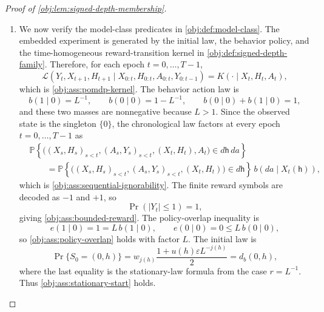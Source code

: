 \documentclass[11pt]{article}
\begin{document}
\begin{proof}[Proof of \cref{obj:lem:signed-depth-membership}]
\begin{enumerate}
\item We now verify the model-class predicates in \cref{obj:def:model-class}.
The embedded experiment is generated by the initial law, the behavior policy,
and the time-homogeneous reward-transition kernel in
\cref{obj:def:signed-depth-family}.  Therefore, for each epoch
\(t=0,\ldots,T-1\),
\[
\mathcal L(Y_t,X_{t+1},H_{t+1}\mid X_{0:t},H_{0:t},A_{0:t},Y_{0:t-1})
=
K(\cdot\mid X_t,H_t,A_t),
\]
which is \cref{obj:ass:pomdp-kernel}.  The behavior action law is
\[
b(1\mid0)=L^{-1},
\qquad
b(0\mid0)=1-L^{-1},
\qquad
b(0\mid0)+b(1\mid0)=1,
\]
and these two masses are nonnegative because \(L>1\).  Since the observed
state is the singleton \(\{0\}\), the chronological law factors at every epoch
\(t=0,\ldots,T-1\) as
\[
\begin{aligned}
&\mathbb P\!\left\{
\bigl((X_s,H_s)_{s<t},(A_s,Y_s)_{s<t},(X_t,H_t),A_t\bigr)
\in d\mathsf h\,da
\right\} \\
&\qquad=
\mathbb P\!\left\{
\bigl((X_s,H_s)_{s<t},(A_s,Y_s)_{s<t},(X_t,H_t)\bigr)
\in d\mathsf h
\right\}\,b(da\mid X_t(\mathsf h)),
\end{aligned}
\]
which is \cref{obj:ass:sequential-ignorability}.  The finite reward symbols are
decoded as \(-1\) and \(+1\), so
\[
\Pr(|Y_t|\le1)=1,
\]
giving \cref{obj:ass:bounded-reward}.  The policy-overlap inequality is
\[
e(1\mid0)=1=L\,b(1\mid0),
\qquad
e(0\mid0)=0\le L\,b(0\mid0),
\]
so \cref{obj:ass:policy-overlap} holds with factor \(L\).  The initial law is
\[
\Pr\{S_0=(0,h)\}
=
w_{j(h)}
\frac{1+u(h)\varepsilon L^{-j(h)}}2
=
d_b(0,h),
\]
where the last equality is the stationary-law formula from the case
\(r=L^{-1}\).  Thus \cref{obj:ass:stationary-start} holds.


\end{enumerate}
\end{proof}
\end{document}
